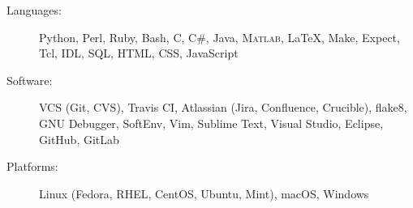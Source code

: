 
\begin{description}
    \item [Languages:] Python, Perl, Ruby, Bash, C, C\#, Java, \textsc{Matlab}, \LaTeX, Make, Expect, Tcl, IDL, SQL, HTML, CSS, JavaScript
    \item [Software:]  VCS (Git, CVS), Travis CI, Atlassian (Jira, Confluence, Crucible), flake8, GNU Debugger, SoftEnv, Vim, Sublime Text, Visual Studio, Eclipse, GitHub, GitLab
    \item [Platforms:] Linux (Fedora, RHEL, CentOS, Ubuntu, Mint), macOS, Windows
\end{description}
